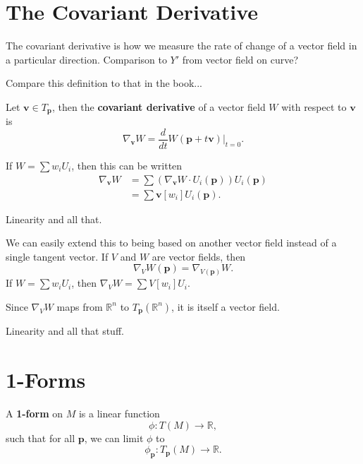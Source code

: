 \documentclass[10pt]{report}
\begin{document}

\section{The Covariant Derivative}

The covariant derivative is how we measure the rate of change of a vector field in a particular direction. {\color{red}Comparison to $Y'$ from vector field on curve?}

{\color{red}Compare this definition to that in the book...}

\begin{defn}[]
	Let $\mathbf{v} \in T_{\mathbf{p}}$, then the \textbf{covariant derivative} of a vector field $W$ with respect to $\mathbf{v}$ is
	\[
		\nabla_{\mathbf{v}}W = \frac{d }{d t} W(\mathbf{p}+t\mathbf{v})\Big|_{t=0}.
	\] 
\end{defn}

If $W = \sum w_i U_i$, then this can be written
\begin{align*}
	\nabla_{\mathbf{v}}W &= \sum \left( \nabla_{\mathbf{v}}W \cdot U_i(\mathbf{p}) \right) U_i(\mathbf{p}) \\
			     &= \sum \mathbf{v}[w_i]U_i(\mathbf{p}).
\end{align*}

{\color{red}Linearity and all that.}

We can easily extend this to being based on another vector field instead of a single tangent vector. If $V$ and $W$ are vector fields, then
\[
	\nabla_{V}W(\mathbf{p}) = \nabla_{V(\mathbf{p})}W.
\] If $W = \sum w_i U_i$, then $\nabla_{V}W = \sum V[w_i] U_i$.

Since $\nabla_{V}W$ maps from $\mathbb{R}^n$ to $T_{\mathbf{p}}(\mathbb{R}^n)$, it is itself a vector field.

{\color{red}Linearity and all that stuff.}





\section{1-Forms}

\begin{defn}
A \textbf{1-form} on $M$ is a linear function
\[
	\phi:T(M)\to \mathbb{R},
\] such that for all $\mathbf{p}$, we can limit $\phi$ to
\[
	\phi_\mathbf{p}:T_{\mathbf{p}}(M)\to \mathbb{R}.
\] 
\end{defn}
\end{document}
